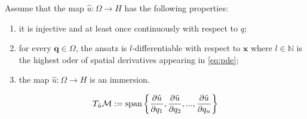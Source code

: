 \begin{assum}
    \label{assum:1}
    Assume that the map $\hat{u}: \Omega \rightarrow H$ has the following properties:
    \begin{enumerate}
        \item it is injective and at least once continuously with respect to $q$;
        \item for every $\mathbf{q}\in \Omega$, the ansatz is $l$-differentiable with respect to $\mathbf{x}$ where $l \in \mathbb{N}$ is the highest oder of spatial derivatives appearing in \eqref{eq:pde};
        \item the map $\hat{u}: \Omega \rightarrow H$ is an immersion.
    \end{enumerate}
\end{assum}

\begin{equation}
    T_{\hat{u}}\mathcal{M} := \text{span}\left\{\frac{\partial \hat{u}}{\partial q_1}, \frac{\partial \hat{u}}{\partial q_2}, ..., \frac{\partial \hat{u}}{\partial q_n}\right\}
\end{equation}